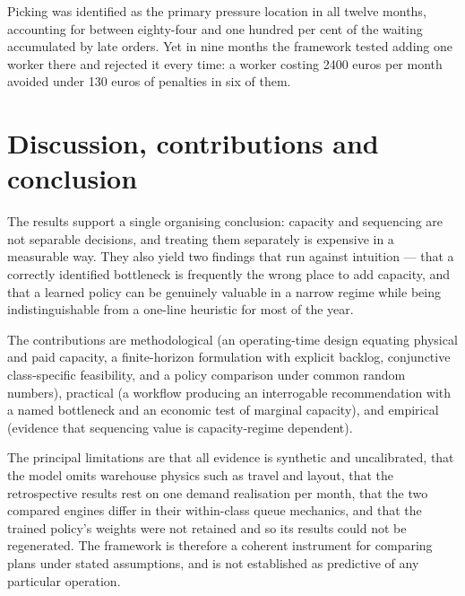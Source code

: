 Picking was identified as the primary pressure location in all twelve months, accounting for
between eighty-four and one hundred per cent of the waiting accumulated by late orders. Yet in
nine months the framework tested adding one worker there and rejected it every time: a worker
costing \num{2400} euros per month avoided under \num{130} euros of penalties in six of them.

\section*{Discussion, contributions and conclusion}

The results support a single organising conclusion: capacity and sequencing are not separable
decisions, and treating them separately is expensive in a measurable way. They also yield two
findings that run against intuition --- that a correctly identified bottleneck is frequently the
wrong place to add capacity, and that a learned policy can be genuinely valuable in a narrow
regime while being indistinguishable from a one-line heuristic for most of the year.

The contributions are methodological (an operating-time design equating physical and paid
capacity, a finite-horizon formulation with explicit backlog, conjunctive class-specific
feasibility, and a policy comparison under common random numbers), practical (a workflow
producing an interrogable recommendation with a named bottleneck and an economic test of
marginal capacity), and empirical (evidence that sequencing value is capacity-regime dependent).

The principal limitations are that all evidence is synthetic and uncalibrated, that the model
omits warehouse physics such as travel and layout, that the retrospective results rest on one
demand realisation per month, that the two compared engines differ in their within-class queue
mechanics, and that the trained policy's weights were not retained and so its results could not
be regenerated. The framework is therefore a coherent instrument for comparing plans under
stated assumptions, and is not established as predictive of any particular operation.
